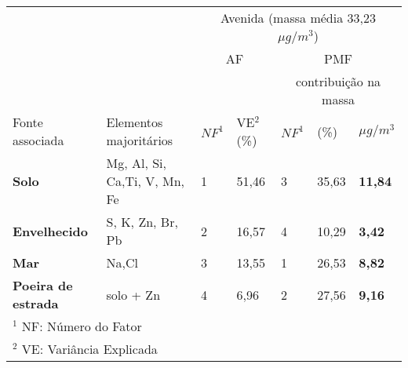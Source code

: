 \begin{tabular}{llll|lll}
\hline
                                                  &                         & \multicolumn{5}{c}{Avenida (massa média 33,23 $\mu g / m^3$)}    \\
                                                  &                         & \multicolumn{2}{c}{AF}                    & \multicolumn{3}{c}{PMF}          \\
\hline
 &  & & & \multicolumn{3}{c}{contribuição na massa} \\
Fonte associada                                   & Elementos majoritários & $NF^1$       & VE$^2$  (\%)            & $NF^1$ & (\%)  & $\mu g / m^3$ \\
\hline
\textbf{Solo}                                                    & Mg, Al, Si, Ca,Ti, V, Mn, Fe &  1  & 51,46               & 3      & 35,63 & \textbf{11,84} \\
\textbf{Envelhecido} & S, K, Zn, Br, Pb             & 2& 16,57               & 4      & 10,29 & \textbf{3,42}  \\
\textbf{Mar}                                                     & Na,Cl                        &  3  & 13,55               & 1      & 26,53 & \textbf{8,82}  \\
\textbf{Poeira de estrada}                                       & solo + Zn                       &  4  & 6,96                & 2      & 27,56 & \textbf{9,16}   \\ 

\hline
\multicolumn{7}{l}{$^1$ NF: Número do Fator} \\
\multicolumn{7}{l}{$^2$ VE: Variância Explicada} \\
\hline
\end{tabular}
